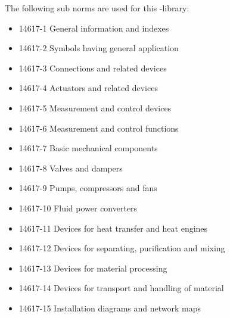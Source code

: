 \documentclass[a4paper]{ltxdoc}
\begin{document}
\bigskip
\noindent The following sub norms are used for this \tikzname-library:
\begin{itemize}
	\setlength\itemsep{0pt}
	\item 14617-1 General information and indexes
	\item 14617-2 Symbols having general application
	\item 14617-3 Connections and related devices
	\item 14617-4 Actuators and related devices
	\item 14617-5 Measurement and control devices
	\item 14617-6 Measurement and control functions
	\item 14617-7 Basic mechanical components
	\item 14617-8 Valves and dampers
	\item 14617-9 Pumps, compressors and fans
	\item 14617-10 Fluid power converters
	\item 14617-11 Devices for heat transfer and heat engines
	\item 14617-12 Devices for separating, purification and mixing
	\item 14617-13 Devices for material processing
	\item 14617-14 Devices for transport and handling of material
	\item 14617-15 Installation diagrams and network maps
\end{itemize}
\end{document}

